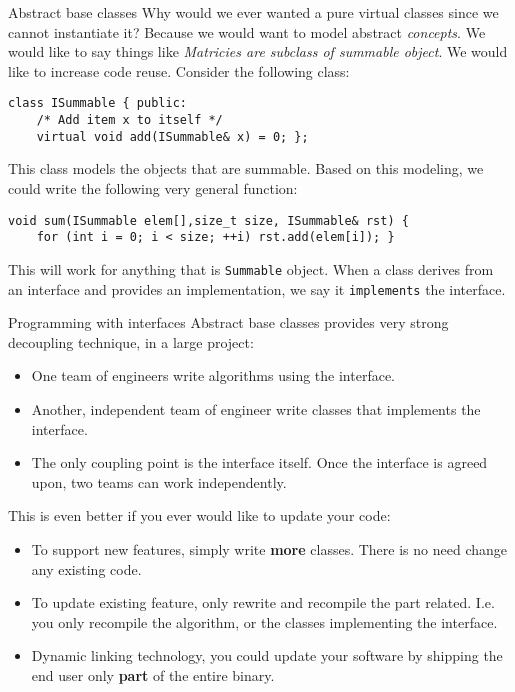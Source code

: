 \begin{frame}[fragile]{Abstract base classes}
Why would we ever wanted a pure virtual classes since we cannot instantiate it? Because we would want to model abstract \textit{concepts}. We would like to say things like \textit{Matricies are subclass of summable object}. We would like to increase code reuse. Consider the following class:

\begin{verbatim}
class ISummable { public: 
    /* Add item x to itself */
    virtual void add(ISummable& x) = 0; };
\end{verbatim}

This class models the objects that are summable. Based on this modeling, we could write the following very general function:

\begin{verbatim}
void sum(ISummable elem[],size_t size, ISummable& rst) {
    for (int i = 0; i < size; ++i) rst.add(elem[i]); }
\end{verbatim}

This will work for anything that is \texttt{Summable} object. When a class derives from an interface and provides an implementation, we say it \texttt{implements} the interface. 
\end{frame}

\begin{frame}[fragile]{Programming with interfaces}
Abstract base classes provides very strong decoupling technique, in a large project:
\begin{itemize}
	\item One team of engineers write algorithms using the interface.
	\item Another, independent team of engineer write classes that implements the interface.
	\item The only coupling point is the interface itself. Once the interface is agreed upon, two teams can work independently.
\end{itemize}
This is even better if you ever would like to update your code:
\begin{itemize}
	\item To support new features, simply write \textbf{more} classes. There is no need change any existing code. 
	\item To update existing feature, only rewrite and recompile the part related. I.e. you only recompile the algorithm, or the classes implementing the interface. 
	\item Dynamic linking technology, you could update your software by shipping the end user only \textbf{part} of the entire binary.
\end{itemize}
\end{frame}


